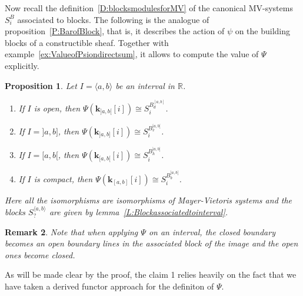 \documentclass[a4paper, english, 11pt]{article}
\newcommand{\kk}[0]{\textbf{k}}
\newcommand{\0}{\vec{0}}
\newcommand{\R}[0]{\mathbb{R}}
\newtheorem{prop}{Proposition}[section]
\newtheorem{remark}[prop]{Remark}
\begin{document}
Now recall the definition~\ref{D:blocksmodulesforMV} of the canonical MV-systems $S_i^B$ associated to blocks. The following is the analogue of proposition~\ref{P:BarofBlock}, that is, it describes the action of $\psi$ on the building blocks of a constructible sheaf. Together with example~\ref{ex:ValueofPsiondirectsum}, it allows to compute the value of $\Psi$ explicitly. 
\begin{prop}\label{P:PsionIntervals}  Let $I=\langle a, b\rangle$ be an interval in $\R$. 
\begin{enumerate}
    \item If $I$ is open, then  $\Psi ({\kk_{]a, b[}}[i]) \cong 
S_i^{B_{d}^{[ a, b ]}}$.
    \item If $I=]a,b]$, then  $\Psi ({ \kk_{] a, b]}}[i]) \cong 
S_i^{B_{v}^{[ a, b[}}$.
    \item If $I=[a, b[$, then  $\Psi ({ \kk_{[ a, b[}}[i]) \cong 
S_i^{B_{h}^{]a, b]}}$. 
    \item If $I$ is compact, then  $\Psi ({ \kk_{[a, b]}}[i]) \cong 
S_i^{B_{b}^{]a, b[}}$. 
\end{enumerate}
Here all the isomorphisms are isomorphisms of Mayer-Vietoris systems and the blocks $S_{?}^{\langle a, b\rangle}$ are given by lemma~\ref{L:Blockassociatedtointerval}. 
\end{prop}
\begin{remark}
 Note that when applying $\Psi$ on an interval, the closed boundary becomes an open boundary lines in the associated block of the image and the open ones  become closed.
\end{remark}

As will be made clear by the proof, the claim 1  relies heavily on the fact that we have taken a derived functor approach for the definiton of $\Psi$. 
\end{document}
